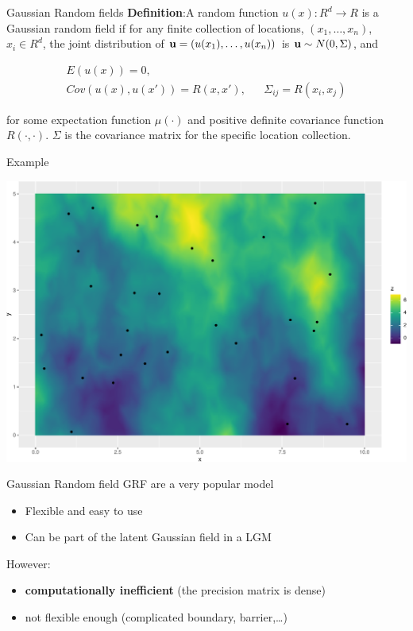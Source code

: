\documentclass[
  ignorenonframetext,
]{beamer}
\begin{document}
\begin{frame}{Gaussian Random fields}
\protect\hypertarget{gaussian-random-fields}{}
\textbf{Definition}:A random function \(u(x):R^d\rightarrow R\) is a
Gaussian random field if for any finite collection of locations,
\((x_1,\dots, x_n)\), \(x_i\in R^d\), the joint distribution of
\({\bf u} = (u(x_1),\dots, u(x_n))\) is \({\bf u} \sim N(0, \Sigma)\),
and

\[
\begin{aligned}
E(u(x)) = 0, &\\ 
Cov(u(x), u(x')) = R(x, x'), && \Sigma_{ij} = R(x_i, x_j)
\end{aligned}
\]

for some expectation function \(\mu(\cdot)\) and positive definite
covariance function \(R(\cdot, \cdot)\). \(\Sigma\) is the covariance
matrix for the specific location collection.
\end{frame}

\begin{frame}{Example}
\protect\hypertarget{example}{}
\begin{center}\includegraphics[width=0.6\linewidth]{Part3_advanced_files/figure-beamer/unnamed-chunk-6-1} \end{center}
\end{frame}

\begin{frame}{Gaussian Random field}
\protect\hypertarget{gaussian-random-field}{}
GRF are a very popular model

\begin{itemize}
\item
  Flexible and easy to use
\item
  Can be part of the latent Gaussian field in a LGM
\end{itemize}

However:

\begin{itemize}
\item
  \textbf{computationally inefficient} (the precision matrix is dense)
\item
  not flexible enough (complicated boundary, barrier,\ldots)
\end{itemize}
\end{frame}
\end{document}

